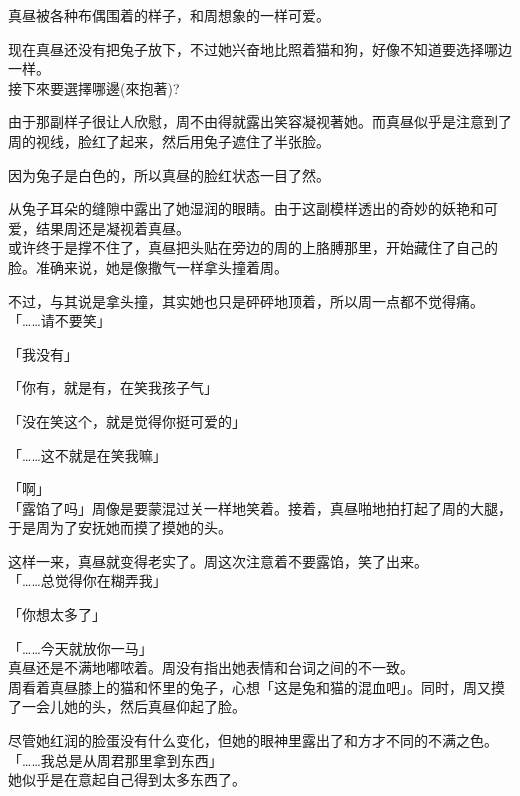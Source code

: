 真昼被各种布偶围着的样子，和周想象的一样可爱。

现在真昼还没有把兔子放下，不过她兴奋地比照着猫和狗，好像不知道要选择哪边一样。\\接下來要選擇哪邊(來抱著)?

由于那副样子很让人欣慰，周不由得就露出笑容凝视著她。而真昼似乎是注意到了周的视线，脸红了起来，然后用兔子遮住了半张脸。

因为兔子是白色的，所以真昼的脸红状态一目了然。

从兔子耳朵的缝隙中露出了她湿润的眼睛。由于这副模样透出的奇妙的妖艳和可爱，结果周还是凝视着真昼。\\

或许终于是撑不住了，真昼把头贴在旁边的周的上胳膊那里，开始藏住了自己的脸。准确来说，她是像撒气一样拿头撞着周。

不过，与其说是拿头撞，其实她也只是砰砰地顶着，所以周一点都不觉得痛。\\

「……请不要笑」

「我没有」

「你有，就是有，在笑我孩子气」

「没在笑这个，就是觉得你挺可爱的」

「……这不就是在笑我嘛」

「啊」\\

「露馅了吗」周像是要蒙混过关一样地笑着。接着，真昼啪地拍打起了周的大腿，于是周为了安抚她而摸了摸她的头。

这样一来，真昼就变得老实了。周这次注意着不要露馅，笑了出来。\\

「……总觉得你在糊弄我」

「你想太多了」

「……今天就放你一马」\\

真昼还是不满地嘟哝着。周没有指出她表情和台词之间的不一致。\\

周看着真昼膝上的猫和怀里的兔子，心想「这是兔和猫的混血吧」。同时，周又摸了一会儿她的头，然后真昼仰起了脸。

尽管她红润的脸蛋没有什么变化，但她的眼神里露出了和方才不同的不满之色。\\

「……我总是从周君那里拿到东西」\\

她似乎是在意起自己得到太多东西了。\\

